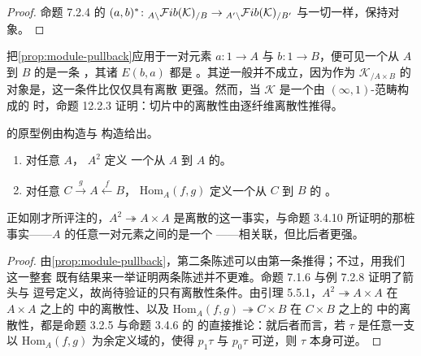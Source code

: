 \begin{proof}
命题 7.2.4 的\trCosmologicalFunctor
$(a,b)^{*}\colon{}_{A\backslash}\mathcal{F}ib(\mathcal{K})_{/B}\to{}_{A'\backslash}\mathcal{F}ib(\mathcal{K})_{/B'}$
与一切\trCosmologicalFunctor{}一样，保持\trDiscrete{}对象。
\end{proof}

把\cref{prop:module-pullback}应用于一对元素 $a\colon 1\to A$ 与
$b\colon 1\to B$，便可见一个从 $A$ 到 $B$ 的\trModule{}是一条%
\trTwoSidedFibration{}，其诸\trFiber{} $E(b,a)$ 都是\trDiscrete{}%
\trInfinityCategory{}。其逆一般并不成立，因为作为\trSliceInfinityCosmos{}
$\mathcal{K}_{/A\times B}$ 的对象是\trDiscrete{}，这一条件比仅仅具有离散%
\trFiber{}更强。然而，当 $\mathcal{K}$ 是一个由 $(\infty,1)$-范畴构成的%
\trInfinityCosmos{}时，命题 12.2.3 证明：切片中的离散性由逐纤维离散性推得。

\trModule{}的原型例由\trArrowInfinityCategory{}构造与\trCommaInfinityCategory{}%
构造给出。

\begin{proposition}[逗号∞-范畴都是模]\label{prop:comma-infinity-categories-are-modules}
\begin{enumerate}[label=(\roman*)]
\item 对任意\trInfinityCategory{} $A$，\trArrowInfinityCategory{} $A^{2}$ 定义
一个从 $A$ 到 $A$ 的\trModule{}。
\item 对任意\trCospan{} $C\overset{g}{\rightarrow}A\overset{f}{\leftarrow}B$，
\trCommaInfinityCategory{} $\mathrm{Hom}_{A}(f,g)$ 定义一个从 $C$ 到 $B$ 的%
\trModule{}。
\end{enumerate}
\end{proposition}

正如刚才所评注的，$A^{2}\twoheadrightarrow A\times A$ 是离散的这一事实，与命题
3.4.10 所证明的那桩事实——$A$ 的任意一对元素之间的\trMappingSpace{}是一个%
\trDiscrete{}\trInfinityCategory——相关联，但比后者更强。

\begin{proof}
由\cref{prop:module-pullback}，第二条陈述可以由第一条推得；不过，用我们这一整套
既有结果来一举证明两条陈述并不更难。命题 7.1.6 与例 7.2.8 证明了箭头\trSpan{}与
逗号\trSpan{}定义\trTwoSidedFibration{}，故尚待验证的只有离散性条件。由引理
5.5.1，$A^{2}\twoheadrightarrow A\times A$ 在 $A\times A$ 之上的%
\trSliceInfinityCosmos{}中的离散性、以及
$\mathrm{Hom}_{A}(f,g)\twoheadrightarrow C\times B$ 在 $C\times B$ 之上的%
\trSliceInfinityCosmos{}中的离散性，都是命题 3.2.5 与命题 3.4.6 的%
\trTwoCellConservativity{}的直接推论：就后者而言，若 $\tau$ 是任意一支以
$\mathrm{Hom}_{A}(f,g)$ 为余定义域的\trCell{}，使得 $p_{1}\tau$ 与 $p_{0}\tau$
可逆，则 $\tau$ 本身可逆。
\end{proof}

